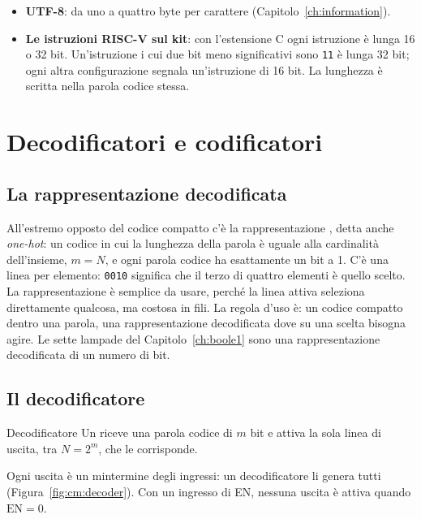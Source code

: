 \begin{itemize}
\item \textbf{UTF-8}: da uno a quattro byte per carattere
  (Capitolo~\ref{ch:information}).
\item \textbf{Le istruzioni RISC-V sul kit}: con l'estensione C ogni istruzione
  è lunga 16 o 32 bit. Un'istruzione i cui due bit meno significativi sono
  \texttt{11} è lunga 32 bit; ogni altra configurazione segnala un'istruzione
  di 16 bit. La lunghezza è scritta nella parola codice stessa.
\end{itemize}

\section{Decodificatori e codificatori}

\subsection{La rappresentazione decodificata}

All'estremo opposto del codice compatto c'è la rappresentazione
, detta anche \emph{one-hot}: un codice in cui la lunghezza
della parola è uguale alla cardinalità dell'insieme, $m=N$, e ogni parola
codice ha esattamente un bit a 1. C'è una linea per elemento: \texttt{0010}
significa che il terzo di quattro elementi è quello scelto. La rappresentazione
è semplice da usare, perché la linea attiva seleziona direttamente qualcosa, ma
costosa in fili. La regola d'uso è: un codice compatto dentro una parola, una
rappresentazione decodificata dove su una scelta bisogna agire. Le sette
lampade del Capitolo~\ref{ch:boole1} sono una rappresentazione decodificata di
un numero di bit.

\subsection{Il decodificatore}

\begin{definition}{Decodificatore}
Un  riceve una parola codice di $m$ bit e attiva la sola
linea di uscita, tra $N=2^{m}$, che le corrisponde.
\end{definition}

Ogni uscita è un mintermine degli ingressi: un decodificatore li genera tutti
(Figura~\ref{fig:cm:decoder}). Con un ingresso di  EN,
nessuna uscita è attiva quando $\mathrm{EN}=0$.

